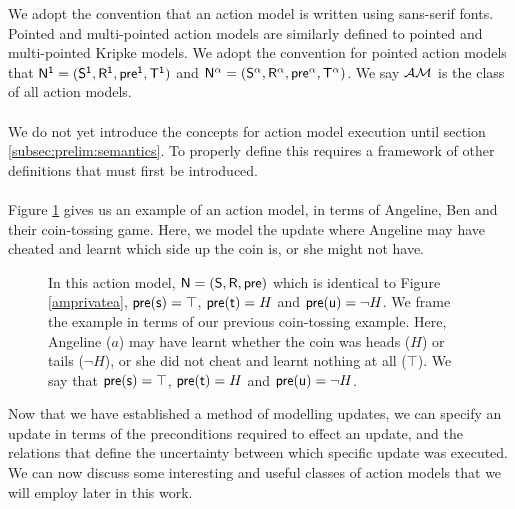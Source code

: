 We adopt the convention that an action model is written using sans-serif fonts.
Pointed and multi-pointed action models are similarly defined to pointed and multi-pointed Kripke
models.
We adopt the convention for pointed action models that $\mathrm{\mathsf{\mathrm{\mathsf{N}}^1 = (S^1, R^1,
pre^1, T^1)}}$ and $\mathrm{\mathsf{\mathrm{\mathsf{N}}^\alpha =
  (S^\alpha,R^\alpha,pre^\alpha,T^\alpha)}}$.
We say $\mathcal{AM}$ is the class of all action models.\\
\\
We do not yet introduce the concepts for action model execution until section
\ref{subsec:prelim:semantics}.
To properly define this requires a framework of other definitions that must first be introduced.\\
\\
Figure \ref{figure:eventModelExample} gives us an example of an action model, in terms of Angeline, Ben and
their coin-tossing game.
Here, we model the update where Angeline may have cheated and learnt which side up the coin is, or she might not have.

\begin{figure}
\centering
{}
\caption[Action model example of coin-game update]{In this action model, $\mathrm{\mathsf{N}} = (\mathrm{\mathsf{S}},\mathrm{\mathsf{R}},\mathrm{\mathsf{pre}})$
	which is identical to Figure \ref{amprivatea},
$\mathrm{\mathsf{pre}}(\mathrm{\mathsf{s}}) = \top$, $\mathrm{\mathsf{pre}}(\mathrm{\mathsf{t}}) = H$ and $\mathrm{\mathsf{pre}}(\mathrm{\mathsf{u}}) = \neg H$. We frame the example in terms of our previous coin-tossing example.
Here, Angeline ($a$) may have learnt whether the coin was heads ($H$) or tails ($\neg H$), or she did not
cheat and learnt nothing at all ($\top$).
We say that $\mathrm{\mathsf{pre}}(\mathrm{\mathsf{s}}) = \top$, $\mathrm{\mathsf{pre}}(\mathrm{\mathsf{t}}) = H$ and $\mathrm{\mathsf{pre}}(\mathrm{\mathsf{u}}) = \neg H$.}
\label{figure:eventModelExample}
\end{figure}

Now that we have established a method of modelling updates, we can specify an update in terms of the
preconditions required to effect an update, and the relations that define the uncertainty between
which specific update was executed.
We can now discuss some interesting and useful classes of action models that we will employ later in this work.


